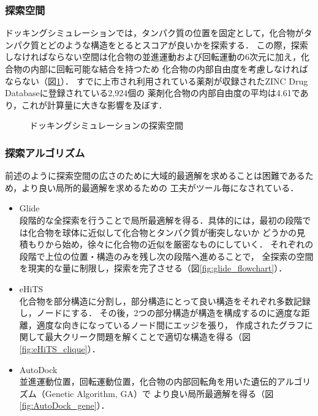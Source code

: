\subsubsection{探索空間}
ドッキングシミュレーションでは，タンパク質の位置を固定として，化合物がタンパク質とどのような構造をとるとスコアが良いかを探索する．
この際，探索しなければならない空間は化合物の並進運動および回転運動の6次元に加え，化合物の内部に回転可能な結合を持つため
化合物の内部自由度を考慮しなければならない（図\ref{fig:docking_freedom}）．
すでに上市され利用されている薬剤が収録されたZINC Drug Databaseに登録されている2,924個の
薬剤化合物の内部自由度の平均は4.61であり，これが計算量に大きな影響を及ぼす．

\begin{figure}[tb]
 \begin{center}
  \caption{ドッキングシミュレーションの探索空間}
  \label{fig:docking_freedom}
 \end{center}
\end{figure}


\subsubsection{探索アルゴリズム}
前述のように探索空間の広さのために大域的最適解を求めることは困難であるため，より良い局所的最適解を求めるための
工夫がツール毎になされている．
\begin{itemize}
\item Glide\cite{Friesner2004}\\
	段階的な全探索を行うことで局所最適解を得る．具体的には，最初の段階では化合物を球体に近似して化合物とタンパク質が衝突しないか
	どうかの見積もりから始め，徐々に化合物の近似を厳密なものにしていく．
	それぞれの段階で上位の位置・構造のみを残し次の段階へ進めることで，
	全探索の空間を現実的な量に制限し，探索を完了させる（図\ref{fig:glide_flowchart}）．
\item eHiTS\cite{Zsoldos2007}\\
	化合物を部分構造に分割し，部分構造にとって良い構造をそれぞれ多数記録し，ノードにする．
	その後，2つの部分構造が構造を構成するのに適度な距離，適度な向きになっているノード間にエッジを張り，
	作成されたグラフに関して最大クリーク問題を解くことで適切な構造を得る（図\ref{fig:eHiTS_clique}）．
\item AutoDock\cite{Morris2009}\\
	並進運動位置，回転運動位置，化合物の内部回転角を用いた遺伝的アルゴリズム（Genetic Algorithm, GA）で
	より良い局所最適解を得る（図\ref{fig:AutoDock_gene}）．
\end{itemize}

